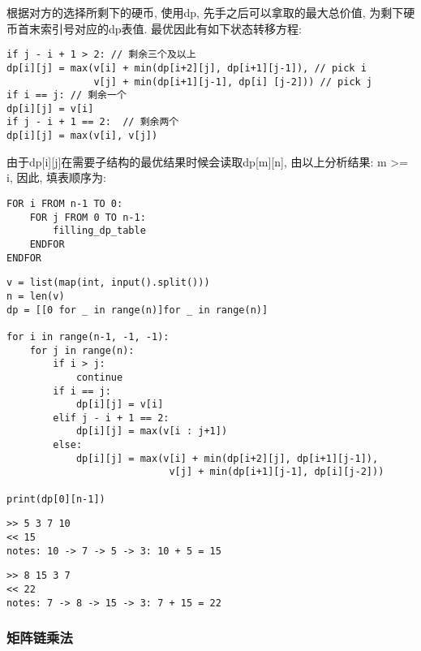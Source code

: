 \documentclass[../main]{subfiles}
\begin{document}
\begin{sloppy}
根据对方的选择所剩下的硬币, 使用dp, 先手之后可以拿取的最大总价值, 为剩下硬币首末索引号对应的dp表值. 最优因此有如下状态转移方程:
\begin{verbatim}
if j - i + 1 > 2: // 剩余三个及以上
dp[i][j] = max(v[i] + min(dp[i+2][j], dp[i+1][j-1]), // pick i
               v[j] + min(dp[i+1][j-1], dp[i] [j-2])) // pick j
if i == j: // 剩余一个
dp[i][j] = v[i]
if j - i + 1 == 2:  // 剩余两个
dp[i][j] = max(v[i], v[j])
\end{verbatim}

由于dp[i][j]在需要子结构的最优结果时候会读取dp[m][n], 由以上分析结果: m >= i, 因此, 填表顺序为:
\begin{lstlisting}[style = Pseudocode]
FOR i FROM n-1 TO 0:
    FOR j FROM 0 TO n-1:
        filling_dp_table
    ENDFOR
ENDFOR
\end{lstlisting}

\begin{lstlisting}[style = Python]
v = list(map(int, input().split()))
n = len(v)
dp = [[0 for _ in range(n)]for _ in range(n)]

for i in range(n-1, -1, -1):
    for j in range(n):
        if i > j:
            continue
        if i == j:
            dp[i][j] = v[i]
        elif j - i + 1 == 2:
            dp[i][j] = max(v[i : j+1])
        else:
            dp[i][j] = max(v[i] + min(dp[i+2][j], dp[i+1][j-1]),
                            v[j] + min(dp[i+1][j-1], dp[i][j-2]))

print(dp[0][n-1])
\end{lstlisting}
\begin{center}
\begin{minipage}[t]{0.48\textwidth}
\begin{center}
    \begin{verbatim}
>> 5 3 7 10
<< 15
notes: 10 -> 7 -> 5 -> 3: 10 + 5 = 15
    \end{verbatim}
\end{center}
\end{minipage}
\begin{minipage}[t]{0.48\textwidth}
\begin{center}
    \begin{verbatim}
>> 8 15 3 7
<< 22
notes: 7 -> 8 -> 15 -> 3: 7 + 15 = 22
    \end{verbatim}
\end{center}
\end{minipage}
\end{center}

\newpage
\subsubsection{矩阵链乘法}


\end{sloppy}
\end{document}
